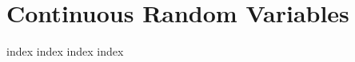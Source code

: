 \chapter{Continuous Random Variables}
\label{ch:cp}
\ifdefined\HCode
\else
{
\startcontents[chapter]
}
\fi

{index}
{index}
{index}
{index}

\ifdefined\HCode
{}
\fi

\ifdefined\HCode
\else
{
\stopcontents[chapter]
}
\fi

\ifdefined\HCode
{}
\fi
